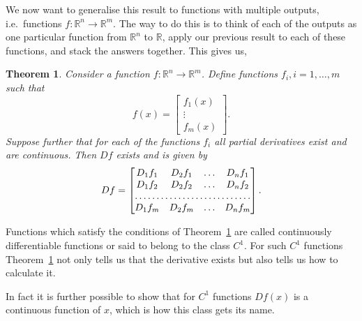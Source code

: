 \documentclass[11pt,reqno,openany]{amsbook}
\numberwithin{figure}{chapter}
\numberwithin{equation}{chapter}
\theoremstyle{plain}
\newtheorem{thm}{Theorem}[chapter]
\theoremstyle{definition}
\renewcommand{\Re}{\mathbb{R}}
\begin{document}
We now want to generalise this result to functions with
multiple outputs, i.e.\ functions $f \colon \Re^n \to
\Re^m$. The way to do this is to think of each of the outputs
as one particular function from $\Re^n$ to $\Re$, apply our
previous result to each of these functions, and stack the
answers together. This gives us,
\begin{thm}\label{thm:c1-jacobian}
  Consider a function $f\colon \Re^n \to \Re^m$. Define
  functions $f_i, i=1,\ldots,m$ such that
  \[f(x) = \begin{bmatrix}
    f_1(x)\\
    \vdots\\
    f_m(x)
    \end{bmatrix}
  .\]
  Suppose further that for each of the functions $f_i$ all
  partial derivatives exist and are continuous. Then $Df$
  exists and is given by
  \[Df = \begin{bmatrix} 
    D_1 f_1 & D_2 f_1 & \hdots & D_n f_1\\
    D_1 f_2 & D_2 f_2 & \hdots & D_n f_2\\
    \hdotsfor{4}\\
    D_1 f_m & D_2 f_m & \hdots & D_n f_m
    \end{bmatrix}
    .\]
\end{thm}

Functions which satisfy the conditions of
Theorem~\ref{thm:c1-jacobian} are called continuously
differentiable functions or said to belong to the class
$C^1$. For such $C^1$ functions
Theorem~\ref{thm:c1-jacobian} not only tells us that the
derivative exists but also tells us how to calculate it. 

In fact it is further possible to show that for $C^1$
functions $Df(x)$ is a continuous function of $x$, which is
how this class gets its name. 
\end{document}
